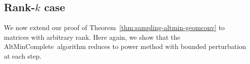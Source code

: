 \documentclass[11pt]{article}
\renewcommand{\eqref}[1]{\hyperref[#1]{(\ref*{#1})}}
\theoremstyle{plain}
\theoremstyle{definition}
\newcommand{\wh}{\widehat}
\newcommand{\dist}{\mathrm{dist}}
\newcommand{\frob}[1]{\left\| {#1} \right\|_\text{F}}
\newcommand{\amc}{AltMinComplete\ }
\begin{document}
\subsection{Rank-$k$ case}\label{sec:comp_general}
We now extend our proof of Theorem~\ref{thm:sampling-altmin-geomconv}  to matrices with arbitrary rank. Here again, we show that the \amc algorithm reduces to power method with bounded perturbation at each step. %
\end{document}
